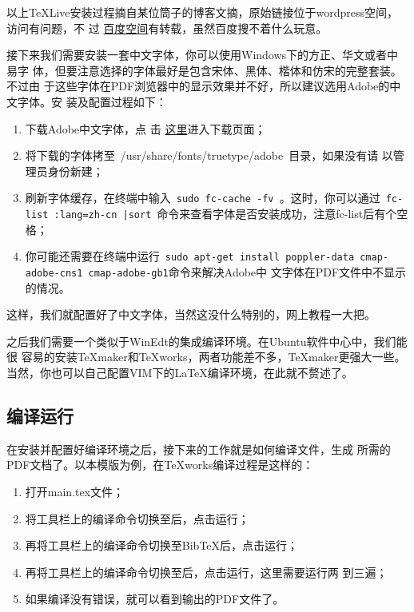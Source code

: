 以上\TeX{}Live安装过程摘自某位筒子的博客文摘，原始链接位于wordpress空间，
访问有问题，不
过
\href{http://hi.baidu.com/skubuntu/blog/item/89e8de2f73a465e08a1399a3.html}{
  百度空间}有转载，虽然百度搜不着什么玩意。

接下来我们需要安装一套中文字体，你可以使用Windows下的方正、华文或者中易字
体，但要注意选择的字体最好是包含宋体、黑体、楷体和仿宋的完整套装。不过由
于这些字体在PDF浏览器中的显示效果并不好，所以建议选用Adobe的中文字体。安
装及配置过程如下：
\begin{enumerate}
\item 下载Adobe中文字体，点
  击
  \href{http://forum.ubuntu.org.cn/viewtopic.php?f=35&t=180987&start=0}{
    这里}进入下载页面；
\item 将下载的字体拷至~{/usr/share/fonts/truetype/adobe}~目录，如果没有请
  以管理员身份新建；
\item 刷新字体缓存，在终端中输入~\texttt{\footnotesize sudo fc-cache -fv }。这时，你可以通过~\texttt{\footnotesize fc-list :lang=zh-cn |sort}~命令来查看字体是否安装成功，注意fc-list后有个空格；
\item 你可能还需要在终端中运行~\texttt{\footnotesize sudo apt-get
    install poppler-data cmap-adobe-cns1 cmap-adobe-gb1}命令来解决Adobe中
  文字体在PDF文件中不显示的情况。
\end{enumerate}
这样，我们就配置好了中文字体，当然这没什么特别的，网上教程一大把。

之后我们需要一个类似于WinEdt的集成编译环境。在Ubuntu软件中心中，我们能很
容易的安装\TeX{}maker和\TeX{}works，两者功能差不多，\TeX{}maker更强大一些。
当然，你也可以自己配置VIM下的\LaTeX{}编译环境，在此就不赘述了。

\subsection{编译运行}


在安装并配置好编译环境之后，接下来的工作就是如何编译\XeLaTeX{}文件，生成
所需的PDF文档了。以本模版为例，在\TeX{}works编译过程是这样的：
\begin{enumerate}
\item 打开main.tex文件；
\item 将工具栏上的编译命令切换至\XeLaTeX{}后，点击运行；
\item 再将工具栏上的编译命令切换至Bib\TeX{}后，点击运行；
\item 再将工具栏上的编译命令切换至\XeLaTeX{}后，点击运行，这里需要运行两
  到三遍；
\item 如果编译没有错误，就可以看到输出的PDF文件了。
\end{enumerate}

